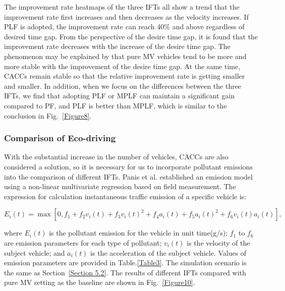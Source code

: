 \documentclass[journal]{IEEEtran}
\begin{document}
The improvement rate heatmaps of the three IFTs all show a trend that the improvement rate first increases and then decreases as the velocity increases. If PLF is adopted, the improvement rate can reach 40\% and above regardless of desired time gap. From the perspective of the desire time gap, it is found that the improvement rate decreases with the increase of the desire time gap. The phenomenon may be explained by that pure MV vehicles tend to be more and more stable with the improvement of the desire time gap. At the same time, CACCs remain stable so that the relative improvement rate is getting smaller and smaller. In addition, when we focus on the differences between the three IFTs, we find that adopting PLF or MPLF can maintain a significant gain compared to PF, and PLF is better than MPLF, which is similar to the conclusion in Fig.~\ref{Figure8}.

\subsubsection{Comparison of Eco-driving}

With the substantial increase in the number of vehicles, CACCs are also considered a solution, so it is necessary for us to incorporate pollutant emissions into the comparison of different IFTs. Panis et al.\citep{panis2006modelling} established an emission model using a non-linear multivariate regression based on field measurement. The expression for calculation instantaneous traffic emission of a specific vehicle is:

\begin{small}
\begin{equation}
E_{i}(t)=\max \left[0, f_{1}\!+\!f_{2} v_{i}(t)\!+\!f_{3} v_{i}(t)^{2}\!+\!f_{4} a_{i}(t)\!+\!f_{5} a_{i}(t)^{2}\!+\!f_{6} v_{i}(t) a_{i}(t)\right],
\end{equation}
\end{small}
where $E_i (t)$ is the pollutant emission for the vehicle in unit time(g/s); $f_1$ to $f_6$ are emission parameters for each type of pollutant; $v_i (t)$ is the velocity of the subject vehicle; and $a_i (t)$ is the acceleration of the subject vehicle. Values of emission parameters are provided in Table.\ref{Table3}. The simulation scenario is the same as Section~\ref{Section 5.2}. The results of different IFTs compared with pure MV setting as the baseline are shown in Fig.~\ref{Figure10}.
\end{document}
